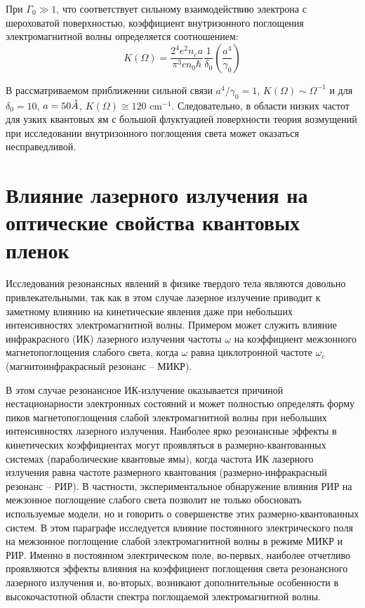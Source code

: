 При $\Gamma_0 \gg 1$, что соответствует сильному взаимодействию электрона с шероховатой поверхностью, коэффициент внутризонного поглощения электромагнитной волны определяется соотношением:
\begin{equation} \label{eq:21_40}
K(\Omega )=\frac{2^4 e^2 n_e a}{\pi^3 cn_0 \hbar } \frac{1}{\delta_0 } \left(\frac{a^4 }{\gamma_0 } \right)
\end{equation} 

В рассматриваемом приближении сильной связи $a^4 /\gamma_0 =1$, $K(\Omega )\sim \Omega ^{-1} $ и для $\delta_0 =10$, $a=50 \AA$, $K(\Omega )\cong 120 \text{ cm}^{-1} $. Следовательно, в области низких частот для узких квантовых ям с большой флуктуацией поверхности теория возмущений при исследовании внутризонного поглощения света может оказаться несправедливой.
	

\section{Влияние лазерного излучения на оптические свойства квантовых пленок} \label{sect2_2}

Исследования резонансных явлений в физике твердого тела являются довольно привлекательными, так как в этом случае лазерное излучение приводит к заметному влиянию на кинетические явления даже при небольших интенсивностях электромагнитной волны. Примером может служить влияние инфракрасного (ИК) лазерного излучения частоты $\omega $ на коэффициент межзонного магнетопоглощения слабого света, когда $\omega $ равна циклотронной частоте $\omega_c $ (магнитоинфракрасный резонанс -- МИКР).

В этом случае резонансное ИК-излучение оказывается причиной нестационарности электронных состояний и может полностью определять форму пиков магнетопоглощения слабой электромагнитной волны при небольших интенсивностях лазерного излучения. Наиболее ярко резонансные эффекты в кинетических коэффициентах могут проявляться в размерно-квантованных системах (параболические квантовые ямы), когда частота ИК лазерного излучения равна частоте размерного квантования (размерно-инфракрасный резонанс -- РИР). В частности, экспериментальное обнаружение влияния РИР на межзонное поглощение слабого света позволит не только обосновать используемые модели, но и говорить о совершенстве этих размерно-квантованных систем. В этом параграфе исследуется влияние постоянного электрического поля на межзонное поглощение слабой электромагнитной волны в режиме МИКР и РИР. Именно в постоянном электрическом поле, во-первых, наиболее отчетливо проявляются эффекты влияния на коэффициент поглощения света резонансного лазерного излучения и, во-вторых, возникают дополнительные особенности в высокочастотной области спектра поглощаемой электромагнитной волны.

